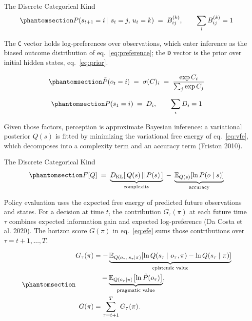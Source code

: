 \documentclass[
  ignorenonframetext,
]{beamer}
\begin{document}
\begin{frame}{The Discrete Categorical Kind}
\begin{equation}\protect\phantomsection\label{eq:transition}{P(s_{t+1} = i \mid s_t = j,\, u_t = k) \;=\; B^{(k)}_{ij}, \qquad \sum_i B^{(k)}_{ij} = 1}\end{equation}

The \texttt{C} vector holds log-preferences over observations, which
enter inference as the biased outcome distribution of
eq.~\ref{eq:preference}; the \texttt{D} vector is the prior over initial
hidden states, eq.~\ref{eq:prior}.

\begin{equation}\protect\phantomsection\label{eq:preference}{\tilde{P}(o_t = i) \;=\; \sigma(C)_i \;=\; \frac{\exp C_i}{\sum_j \exp C_j}}\end{equation}

\begin{equation}\protect\phantomsection\label{eq:prior}{P(s_1 = i) \;=\; D_i, \qquad \sum_i D_i = 1}\end{equation}

Given those factors, perception is approximate Bayesian inference: a
variational posterior \(Q(s)\) is fitted by minimizing the variational
free energy of eq.~\ref{eq:vfe}, which decomposes into a complexity term
and an accuracy term (Friston 2010).

\end{frame}

\begin{frame}{The Discrete Categorical Kind}
\begin{equation}\protect\phantomsection\label{eq:vfe}{F[Q] \;=\; \underbrace{D_{\mathrm{KL}}\!\left[\,Q(s) \,\|\, P(s)\,\right]}_{\text{complexity}} \;-\; \underbrace{\mathbb{E}_{Q(s)}\!\left[\ln P(o \mid s)\right]}_{\text{accuracy}}}\end{equation}

Policy evaluation uses the expected free energy of predicted future
observations and states. For a decision at time \(t\), the contribution
\(G_\tau(\pi)\) at each future time \(\tau\) combines expected
information gain and expected log-preference (Da Costa et al. 2020). The
horizon score \(G(\pi)\) in eq.~\ref{eq:efe} sums those contributions
over \(\tau=t+1,\ldots,T\).

\begin{equation}\protect\phantomsection\label{eq:efe}{\begin{aligned}
G_\tau(\pi) &= -\underbrace{\mathbb{E}_{Q(o_\tau,\, s_\tau \mid \pi)}\!\left[\ln Q(s_\tau \mid o_\tau, \pi) - \ln Q(s_\tau \mid \pi)\right]}_{\text{epistemic value}} \\
&\quad - \underbrace{\mathbb{E}_{Q(o_\tau \mid \pi)}\!\left[\ln \tilde{P}(o_\tau)\right]}_{\text{pragmatic value}}, \\
G(\pi) &= \sum_{\tau=t+1}^{T} G_\tau(\pi).
\end{aligned}}\end{equation}

\end{frame}
\end{document}
